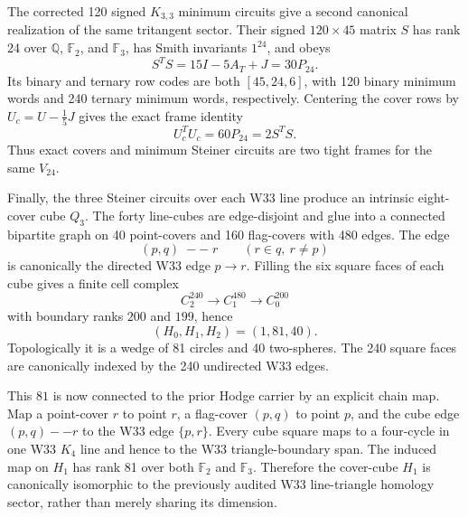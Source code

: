 The corrected 120 signed $K_{3,3}$ minimum circuits give a second canonical realization of the same tritangent sector.  Their signed $120\times45$ matrix $S$ has rank 24 over $\mathbb Q$, $\mathbb F_2$, and $\mathbb F_3$, has Smith invariants $1^{24}$, and obeys
\[
S^TS=15I-5A_T+J=30P_{24}.
\]
Its binary and ternary row codes are both $[45,24,6]$, with 120 binary minimum words and 240 ternary minimum words, respectively.  Centering the cover rows by $U_c=U-\frac15J$ gives the exact frame identity
\[
U_c^TU_c=60P_{24}=2S^TS.
\]
Thus exact covers and minimum Steiner circuits are two tight frames for the same $V_{24}$.

Finally, the three Steiner circuits over each W33 line produce an intrinsic eight-cover cube $Q_3$.  The forty line-cubes are edge-disjoint and glue into a connected bipartite graph on 40 point-covers and 160 flag-covers with 480 edges.  The edge
\[
(p,q)\;--\;r\qquad(r\in q,\ r\neq p)
\]
is canonically the directed W33 edge $p\to r$.  Filling the six square faces of each cube gives a finite cell complex
\[
C_2^{240}\longrightarrow C_1^{480}\longrightarrow C_0^{200}
\]
with boundary ranks $200$ and $199$, hence
\[
(H_0,H_1,H_2)=(1,81,40).
\]
Topologically it is a wedge of 81 circles and 40 two-spheres.  The 240 square faces are canonically indexed by the 240 undirected W33 edges.

This $81$ is now connected to the prior Hodge carrier by an explicit chain map.  Map a point-cover $r$ to point $r$, a flag-cover $(p,q)$ to point $p$, and the cube edge $(p,q)--r$ to the W33 edge $\{p,r\}$.  Every cube square maps to a four-cycle in one W33 $K_4$ line and hence to the W33 triangle-boundary span.  The induced map on $H_1$ has rank 81 over both $\mathbb F_2$ and $\mathbb F_3$.  Therefore the cover-cube $H_1$ is canonically isomorphic to the previously audited W33 line-triangle homology sector, rather than merely sharing its dimension.
